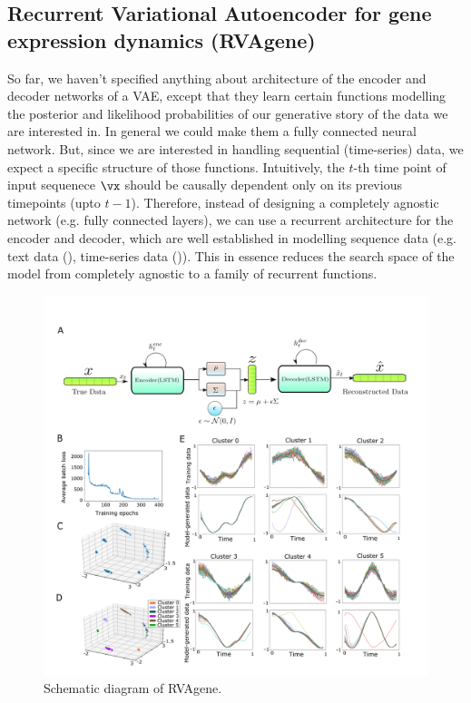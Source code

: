 \subsection{Recurrent Variational Autoencoder for gene expression dynamics (RVAgene)}
So far, we haven't specified anything about architecture of the encoder and decoder networks of a VAE, except that they learn certain functions modelling the posterior and likelihood probabilities  of our generative story of the data we are interested in. In general we could make them a fully connected neural network. But, since we are interested in handling sequential (time-series) data, we expect a specific structure of those functions. Intuitively, the $t$-th time point of input sequenece $\vx$ should be causally dependent only on its previous timepoints (upto $t-1$).  Therefore, instead of designing a completely agnostic network (e.g. fully connected layers), we can use a recurrent architecture for the encoder and decoder, which are well established in modelling sequence data (e.g. text data (\cite{Nallapati2016}), time-series data (\cite{Malhotra2015})). This in essence reduces the search space of the model from completely agnostic to a family of recurrent functions.

\begin{center}

\begin{figure}[h]
\centering
  \includegraphics[width=\linewidth]{figures/fig1.png}
 \caption{Schematic diagram of RVAgene.}
 \label{fig:scheme}
\end{figure}


\end{center}

